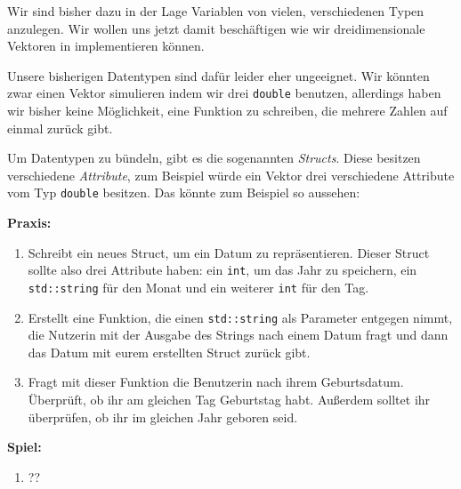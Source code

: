 
Wir sind bisher dazu in der Lage Variablen von vielen, verschiedenen Typen anzulegen.
Wir wollen uns jetzt damit beschäftigen wie wir dreidimensionale Vektoren in \Cpp implementieren können.

Unsere bisherigen Datentypen sind dafür leider eher ungeeignet.
Wir könnten zwar einen Vektor simulieren indem wir drei \texttt{double} benutzen, allerdings haben wir bisher keine Möglichkeit, eine Funktion zu schreiben, die mehrere Zahlen auf einmal zurück gibt.

Um Datentypen zu bündeln, gibt es die sogenannten \emph{Structs}.
Diese besitzen verschiedene \emph{Attribute}, zum Beispiel würde ein Vektor drei verschiedene Attribute vom Typ \texttt{double} besitzen.
Das könnte zum Beispiel so aussehen:


%

\textbf{Praxis:}
\begin{enumerate}
	\item Schreibt ein neues Struct, um ein Datum zu repräsentieren.
Dieser Struct sollte also drei Attribute haben:
	ein \texttt{int}, um das Jahr zu speichern,
	ein \texttt{std::string} für den Monat
	und ein weiterer \texttt{int} für den Tag.

	\item Erstellt eine Funktion, die einen \texttt{std::string} als Parameter entgegen nimmt, die Nutzerin mit der Ausgabe des Strings nach einem Datum fragt und dann das Datum mit eurem erstellten Struct zurück gibt.
	
	\item Fragt mit dieser Funktion die Benutzerin nach ihrem Geburtsdatum. Überprüft, ob ihr am gleichen Tag Geburtstag habt.
Außerdem solltet ihr überprüfen, ob ihr im gleichen Jahr geboren seid.
\end{enumerate}

\textbf{Spiel:}
\begin{enumerate}
	\item ??
\end{enumerate}